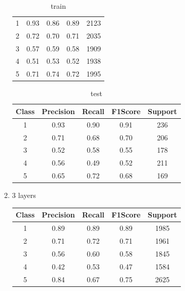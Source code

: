\begin{enumerate}[label=(\alph*)]
\begin{enumerate}[label=\roman*.]
\begin{table}[!htb]
\begin{tabular}{ccccc}
            1     & 0.93      & 0.86   & 0.89    & 2123    \\
            2     & 0.72      & 0.70   & 0.71    & 2035    \\
            3     & 0.57      & 0.59   & 0.58    & 1909    \\
            4     & 0.51      & 0.53   & 0.52    & 1938    \\
            5     & 0.71      & 0.74   & 0.72    & 1995    \\ \hline
            \end{tabular}
            \caption{train}
            \label{part c train depth 2}
        \end{table}
        \begin{table}[!htb]
            \centering
            \begin{tabular}{ccccc}
            \hline
            Class & Precision & Recall & F1Score & Support \\ \hline
            1     & 0.93      & 0.90   & 0.91    & 236     \\
            2     & 0.71      & 0.68   & 0.70    & 206     \\
            3     & 0.52      & 0.58   & 0.55    & 178     \\
            4     & 0.56      & 0.49   & 0.52    & 211     \\
            5     & 0.65      & 0.72   & 0.68    & 169     \\ \hline
            \end{tabular}
            \caption{test}
            \label{part c test depth 2}
        \end{table}
        \newpage
        \item 3 layers
        \begin{table}[!htb]
            \centering
            \begin{tabular}{ccccc}
            \hline
            Class & Precision & Recall & F1Score & Support \\ \hline
            1     & 0.89      & 0.89   & 0.89    & 1985    \\
            2     & 0.71      & 0.72   & 0.71    & 1961    \\
            3     & 0.56      & 0.60   & 0.58    & 1845    \\
            4     & 0.42      & 0.53   & 0.47    & 1584    \\
            5     & 0.84      & 0.67   & 0.75    & 2625    \\ \hline

\end{tabular}
\end{table}
\end{enumerate}
\end{enumerate}
